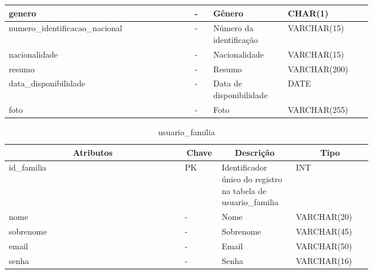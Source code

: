 \begin{enumerate}
\begin{table}[H]
\begin{tabular}{|p{0.40\linewidth} | p{0.04\linewidth} |  p{0.12\linewidth} | p{0.16\linewidth} |}
        genero  &  
        - & 
        Gênero &
        CHAR(1)
        \\  \hline
        
        numero\_identificacao\_nacional  &  
        - & 
        Número da identificação &
        VARCHAR(15)
        \\  \hline
        
        nacionalidade  &  
        - & 
        Nacionalidade &
        VARCHAR(15)
        \\  \hline
        
        resumo  &  
        - & 
        Resumo &
        VARCHAR(200)
        \\  \hline
        
        data\_disponibilidade  &  
        - & 
        Data de disponibilidade &
        DATE
        \\  \hline
        
        foto  &  
        - & 
        Foto &
        VARCHAR(255)
        \\  \hline
       
        \end{tabular}
    \end{table}
\end{enumerate}

\begin{enumerate}
    \begin{table}[H]
    \caption{usuario\_familia}
    \label{idioma}
    	\centering\footnotesize
        \begin{tabular}{|p{0.40\linewidth} | p{0.04\linewidth} |  p{0.12\linewidth} | p{0.16\linewidth} |}  \hline
        \multicolumn{1}{|c|}{\textbf{Atributos}} &
        \multicolumn{1}{|c|}{\textbf{Chave}} &
        \multicolumn{1}{c|}{\textbf{Descrição}} &
        \multicolumn{1}{c|}{\textbf{Tipo}} \\ \hline
          
        id\_familia  &  
        PK & 
        Identificador único do registro na tabela de usuario\_familia &
        INT
        \\  \hline
        
        nome  &  
        - & 
        Nome &
        VARCHAR(20)
        \\  \hline
        
        sobrenome  &  
        - & 
        Sobrenome &
        VARCHAR(45)
        \\  \hline
        
        email  &  
        - & 
        Email &
        VARCHAR(50)
        \\  \hline
        
        senha  &  
        - & 
        Senha &
        VARCHAR(16)
        \\  \hline
       
        \end{tabular}
    \end{table}
\end{enumerate}


